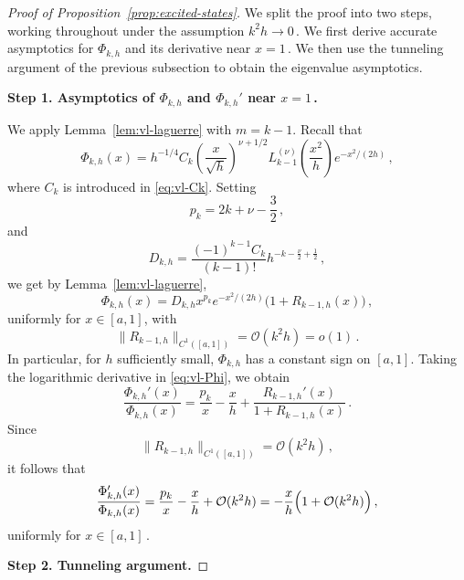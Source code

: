 \documentclass[11pt]{amsart}
\numberwithin{equation}{section}
\theoremstyle{remark}
\begin{document}
\medskip\noindent
\begin{proof}[Proof of Proposition~\ref{prop:excited-states}]
We split the proof into two steps, working throughout under the
assumption
$
k^2h\to0\,.
$
We first derive accurate asymptotics for $\Phi_{k,h}$ and its derivative near $x=1\,$. We then use the tunneling argument of the previous subsection to obtain the eigenvalue asymptotics.

\medskip
\noindent\textbf{Step 1. Asymptotics of $\Phi_{k,h}$ and $\Phi_{k,h}'$ near $x=1\,$.}

\medskip
\noindent
We apply Lemma~\ref{lem:vl-laguerre} with $m=k-1$. Recall that
%
\[	\Phi_{k,h}(x)
	=
	h^{-1/4}C_k
	\left(\frac{x}{\sqrt h}\right)^{\nu+1/2}
	L_{k-1}^{(\nu)}\left(\frac{x^2}{h}\right)
	e^{-x^2/(2h)}\,,\]
%
where $C_k$ is introduced in \eqref{eq:vl-Ck}.
Setting
\[
	p_k=2k+\nu-\frac32\,,
\]
and
\[
	D_{k,h}
	=
	\frac{(-1)^{k-1}C_k}{(k-1)!}
	h^{-k-\frac{\nu}{2}+\frac{1}{2}}\,,
\]
we get by Lemma~\ref{lem:vl-laguerre},
\begin{equation}\label{eq:vl-Phi}
	\Phi_{k,h}(x)
	=
	D_{k,h}x^{p_k}e^{-x^2/(2h)}
	\bigl(1+R_{k-1,h}(x)\bigr)\,,
\end{equation}
uniformly for $x\in[a,1]$, with
\[
	\|R_{k-1,h}\|_{C^1([a,1])}
	=
	\mathcal O(k^2h)
	=
	o(1)\,.
\]
In particular, for $h$ sufficiently small, $\Phi_{k,h}$ has a constant sign on $[a,1]$. Taking the logarithmic derivative in \eqref{eq:vl-Phi}, we obtain
\begin{equation}
	\frac{\Phi_{k,h}'(x)}{\Phi_{k,h}(x)}
	=
	\frac{p_k}{x}
	-\frac{x}{h}
	+
	\frac{R_{k-1,h}'(x)}{1+R_{k-1,h}(x)}\,.
\end{equation}
Since
\[
	\|R_{k-1,h}\|_{C^1([a,1])}=\mathcal O(k^2h)\,,
\]
it follows that
\begin{equation}\label{eq:vl-log-Phi}
	\frac{\Phi_{k,h}'(x)}{\Phi_{k,h}(x)}
	=
	\frac{p_k}{x}-\frac{x}{h}+\mathcal O(k^2h)=-\frac{x}{h}\Bigl(1+\mathcal O(k^2h)\Bigr)\,,
\end{equation}
uniformly for $x\in[a,1]\,$.

\vspace{0.5cm}
\noindent\textbf{Step 2. Tunneling argument.}


\end{proof}
\end{document}
